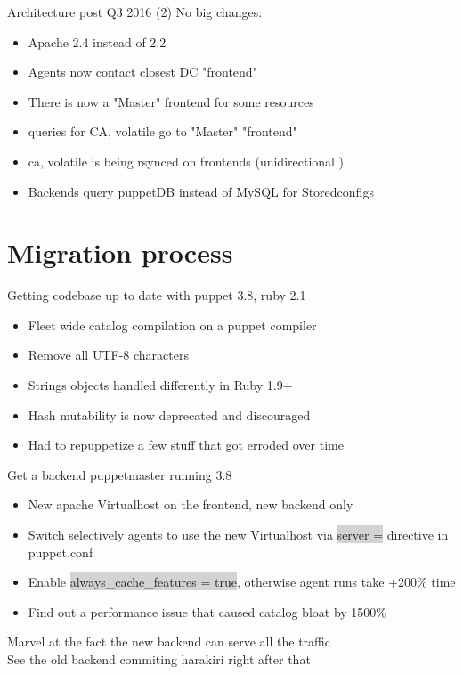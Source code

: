 \documentclass{beamer}
\begin{document}
    \begin{frame}{Architecture post Q3 2016 (2)}
        No big changes:
        \begin{itemize}
            \pause \item Apache 2.4 instead of 2.2
            \pause \item Agents now contact closest DC "frontend"
            \pause \item There is now a "Master" frontend for some resources
            \pause \item queries for CA, volatile go to "Master" "frontend"
            \pause \item ca, volatile is being rsynced on frontends (unidirectional )
            \pause \item Backends query puppetDB instead of MySQL for Storedconfigs
        \end{itemize}
    \end{frame}

\section{Migration process}
    \begin{frame}{Getting codebase up to date with puppet 3.8, ruby 2.1}
        \begin{itemize}
            \pause \item Fleet wide catalog compilation on a puppet compiler
            \pause \item Remove all UTF-8 characters
            \pause \item Strings objects handled differently in Ruby 1.9+
            \pause \item Hash mutability is now deprecated and discouraged
            \pause \item Had to repuppetize a few stuff that got erroded over time
        \end{itemize}
    \end{frame}

    \begin{frame}{Get a backend puppetmaster running 3.8}
        \begin{itemize}
            \pause \item New apache Virtualhost on the frontend, new backend only
            \pause \item Switch selectively agents to use the new Virtualhost via \colorbox{lightgray}{server =} directive in puppet.conf
            \pause \item Enable \colorbox{lightgray}{always\_cache\_features = true}, otherwise agent runs take +200\% time
            \pause \item Find out a performance issue that caused catalog bloat by 1500\%
        \end{itemize}
        \pause Marvel at the fact the new backend can serve all the traffic\\
        \pause See the old backend commiting harakiri right after that
    \end{frame}
\end{document}
